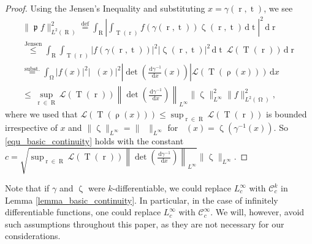 \documentclass[12pt]{article}
\DeclareMathOperator{\Projind}{\mathfrak{p}}
\newcommand{\dd}[1]{\,\mathrm{d}{#1}}
\DeclareMathOperator{\tvariable}{t}
\DeclareMathOperator{\tgroundset}{T}
\DeclareMathOperator{\rayvariable}{r}
\DeclareMathOperator{\raygroundset}{R}
\DeclareMathOperator{\rayinverse}{\rho}
\DeclareMathOperator{\weightfkt}{\zeta}
\DeclareMathOperator{\altweightfkt}{\tilde {\zeta}}
\DeclareMathOperator{\imgdom}{{\Omega}}
\begin{document}
\begin{proof}
Using the Jensen's Inequality \cite{durrett2019probability} and substituting $x=\gamma(\rayvariable,\tvariable)$, we see
\begin{multline}
\|\Projind f\|_{L^{2}(\raygroundset)}^{2} \overset{\text{def}}{=} \int_{\raygroundset} \left| \int _{\tgroundset(\rayvariable)} f(\gamma(\rayvariable,\tvariable))\weightfkt(\rayvariable,\tvariable)\dd \tvariable \right|^{2} \dd \rayvariable 
\\ 
\overset{\text{Jensen}}{\leq} 
\int_{\raygroundset}\int_{\tgroundset(\rayvariable)} |f(\gamma(\rayvariable,\tvariable))|^2 |\weightfkt(\rayvariable,\tvariable)|^2 \dd{\tvariable} \  \mathcal{L}(\tgroundset(\rayvariable)) \dd \rayvariable
\\
\overset{\text{subst.}}{=}\int_{\imgdom}|f(x)|^2|\altweightfkt(x)|^2 \left|\det\left(\frac{\dd {\gamma^{-1}}}{\dd x}(x)\right) \right| \mathcal{L}(\tgroundset(\rayinverse(x))) \dd x
\\
\leq \sup_{\rayvariable\in \raygroundset} \mathcal{L}(\tgroundset(\rayvariable))
\left\| \det \left(\frac{\dd{\gamma^{-1}}}{\dd {x}}\right)\right\|_{L^\infty} \|\weightfkt\|_{L^\infty}^{2}  \|f\|^{2}_{L^{2}(\imgdom)},
\end{multline}
where we used that $\mathcal{L}(\tgroundset(\rayinverse(x)))\leq \sup_{\rayvariable\in \raygroundset} \mathcal{L}(\tgroundset(\rayvariable))$ is bounded irrespective of $x$ and $\|\weightfkt\|_{L^\infty}=\|\altweightfkt\|_{L^\infty}$ for $\altweightfkt(x)=\weightfkt(\gamma^{-1}(x))$. So \eqref{equ_basic_continuity} holds with the constant $c= \sqrt{\sup_{\rayvariable\in \raygroundset} \mathcal{L}(\tgroundset(\rayvariable)) \left\| \det \left(\frac{\dd{\gamma^{-1}}}{\dd {x}}\right)\right\|_{L^\infty}} \|\weightfkt\|_{L^\infty}$.

\end{proof}



Note that if $\gamma$ and $\weightfkt$ were $k$-differentiable, we could replace $L^\infty_c$ with $\mathcal{C}^k_c$ in Lemma \ref{lemma_basic_continuity}. In particular, in the case of infinitely differentiable functions, one could replace $L^\infty_c$ with $\mathcal{C}^\infty_c$. We will, however, avoid such assumptions throughout this paper, as they are not necessary for our considerations.
\end{document}
